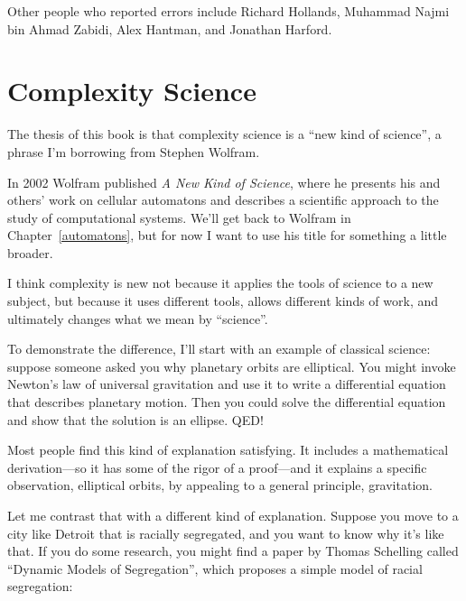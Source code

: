 \documentclass[12pt]{book}
\theoremstyle{exercise}
\begin{document}
Other people who reported errors include 
Richard Hollands,
Muhammad Najmi bin Ahmad Zabidi,
Alex Hantman, and 
Jonathan Harford.




\normalsize



\mainmatter

\chapter{Complexity Science}
\label{overview}

The thesis of this book is that complexity science is a ``new
kind of science'', a phrase I'm borrowing from Stephen Wolfram.

In 2002 Wolfram published {\em A New Kind of Science}, where he
presents his and others' work on cellular automatons and describes a
scientific approach to the study of computational systems.  We'll get
back to Wolfram in Chapter~\ref{automatons}, but for now I want
to use his title for something a little broader.


I think complexity is new not because
it applies the tools of science to a new subject, but because it
uses different tools, allows different kinds of work, and ultimately
changes what we mean by ``science''.

To demonstrate the difference, I'll start with an example of classical
science: suppose someone asked you why planetary orbits are
elliptical.  You might invoke Newton's law of universal
gravitation and use it to write a differential equation that describes
planetary motion.  Then you could solve the differential equation and
show that the solution is an ellipse.  QED!


Most people find this kind of explanation satisfying.  It includes a
mathematical derivation---so it has some of the rigor of a proof---and
it explains a specific observation, elliptical orbits, by appealing to
a general principle, gravitation.


Let me contrast that with a different kind of explanation.  Suppose
you move to a city like Detroit that is racially segregated, and you
want to know why it's like that.  If you do some research, you might
find a paper by Thomas Schelling called ``Dynamic Models of
Segregation'', which proposes a simple model of racial segregation:
\end{document}
